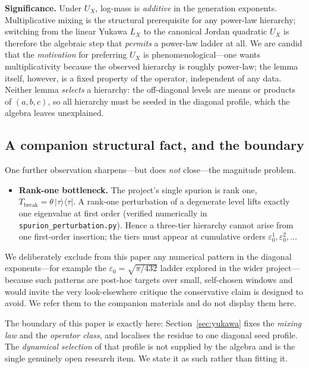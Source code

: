 \documentclass[11pt,a4paper]{article}
\theoremstyle{plain}
\newcommand{\code}[1]{\texttt{#1}}
\newcommand{\epso}{\varepsilon_0}
\begin{document}
\noindent\textbf{Significance.} Under $U_X$, log-mass is \emph{additive} in the
generation exponents. Multiplicative mixing is the structural prerequisite for any
power-law hierarchy; switching from the linear Yukawa $L_X$ to the canonical Jordan
quadratic $U_X$ is therefore the algebraic step that \emph{permits} a power-law
ladder at all. We are candid that the \emph{motivation} for preferring $U_X$ is
phenomenological---one wants multiplicativity because the observed hierarchy is
roughly power-law; the lemma itself, however, is a fixed property of the operator,
independent of any data. Neither lemma \emph{selects} a hierarchy: the off-diagonal
levels are means or products of $(a,b,c)$, so all hierarchy must be seeded in the
diagonal profile, which the algebra leaves unexplained.

\subsection{A companion structural fact, and the boundary}

One further observation sharpens---but does \emph{not} close---the magnitude
problem.

\begin{itemize}[leftmargin=1.4em]
\item \textbf{Rank-one bottleneck.} The project's single spurion is rank one,
  $T_{\mathrm{break}} = \theta\,|\tau\rangle\langle\tau|$. A rank-one perturbation
  of a degenerate level lifts exactly one eigenvalue at first order (verified
  numerically in \code{spurion\_perturbation.py}). Hence a three-tier hierarchy
  cannot arise from one first-order insertion; the tiers must appear at cumulative
  orders $\epso^1, \epso^2, \dots$
\end{itemize}

We deliberately exclude from this paper any numerical pattern in the diagonal
exponents---for example the $\epso = \sqrt{\pi/432}$ ladder explored in the wider
project---because such patterns are post-hoc targets over small, self-chosen
windows and would invite the very look-elsewhere critique the conservative claim is
designed to avoid. We refer them to the companion materials and do not display them
here.

The boundary of this paper is exactly here: Section~\ref{sec:yukawa} fixes
the \emph{mixing law} and the \emph{operator class}, and localises the residue to
one diagonal seed profile. The \emph{dynamical selection} of that profile is not
supplied by the algebra and is the single genuinely open research item. We state
it as such rather than fitting it.
\end{document}
